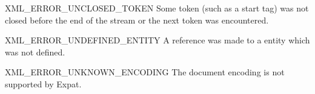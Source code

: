 \begin{datadescni}{XML_ERROR_UNCLOSED_TOKEN}
Some token (such as a start tag) was not closed before the end of the
stream or the next token was encountered.
\end{datadescni}

\begin{datadescni}{XML_ERROR_UNDEFINED_ENTITY}
A reference was made to a entity which was not defined.
\end{datadescni}

\begin{datadescni}{XML_ERROR_UNKNOWN_ENCODING}
The document encoding is not supported by Expat.
\end{datadescni}
